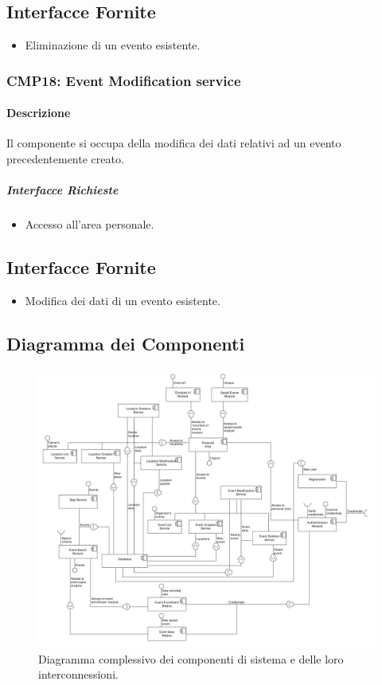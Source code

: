 \documentclass[9pt]{extarticle}
\begin{document}
\subsection{Interfacce Fornite}
\begin{itemize}
	\item Eliminazione di un evento esistente.
\end{itemize}

\subsubsection*{CMP18: Event Modification service}
\paragraph{Descrizione}
Il componente si occupa della modifica dei dati relativi ad un evento precedentemente creato.
\subparagraph{Interfacce Richieste}
\begin{itemize}
	\item Accesso all'area personale.
\end{itemize}
\subsection{Interfacce Fornite}
\begin{itemize}
	\item Modifica dei dati di un evento esistente.
\end{itemize}

\subsection{Diagramma dei Componenti}

\begin{figure}[!htb]
	\centering
	\includegraphics[width=\linewidth]{./images/ComponentDiagramV2.pdf}
	\caption{Diagramma complessivo dei componenti di sistema e delle loro interconnessioni.}
	\label{fig:ComponentDiagram}
\end{figure}
\end{document}
